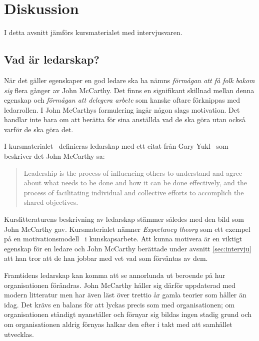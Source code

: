 \section{Diskussion}

I detta avsnitt jämförs kursmaterialet med intervjusvaren.

\subsection{Vad är ledarskap?}
När det gäller egenskaper en god ledare ska ha nämns \textit{förmågan att få folk bakom sig} flera gånger av John McCarthy. Det finns en signifikant skillnad mellan denna egenskap och \textit{förmågan att delegera arbete} som kanske oftare förknippas med ledarrollen. I John McCarthys formulering ingår någon slags motivation. Det handlar inte bara om att berätta för sina anställda vad de ska göra utan också varför de ska göra det.

I kursmaterialet~\citep{leadership} definieras ledarskap med ett citat från Gary Yukl~\citep{yukl} som beskriver det John McCarthy sa:
\begin{quote}
Leadership is the process of influencing others to understand 
and agree about what needs to be done and how it can be 
done effectively, and the process of facilitating individual and 
collective efforts to accomplich the shared objectives.
\end{quote}

Kurslitteraturens beskrivning av ledarskap stämmer således med den bild som John McCarthy gav. Kursmaterialet nämner \textit{Expectancy theory} som ett exempel på en motivationsmodell~\cite{motivation} i kunskapsarbete. Att kunna motivera är en viktigt egenskap för en ledare och John McCarthy berättade under avsnitt \ref{sec:intervju} att han tror att de han jobbar med vet vad som förväntas av dem.

Framtidens ledarskap kan komma att se annorlunda ut beroende på hur organisationen förändras. John McCarthy håller sig därför uppdaterad med modern litteratur men har även läst över trettio år gamla teorier som håller än idag. Det krävs en balans för att lyckas precis som med organisationen; om organisationen ständigt nyanställer och förnyar sig bildas ingen stadig grund och om organisationen aldrig förnyas halkar den efter i takt med att samhället utvecklas.


